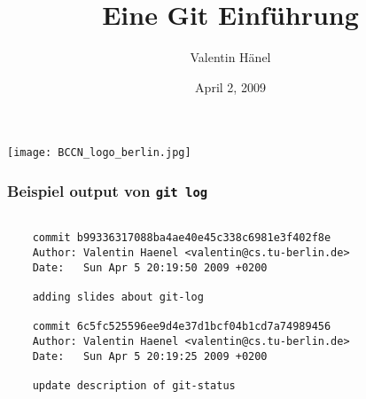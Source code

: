 \documentclass{beamer}
\author{Valentin H\"anel}
\institute{Bernstein Center for Computational Neuroscience Berlin}
\title{Eine Git Einführung}
\date{April 2, 2009}
\begin{document}

\begin{frame}
	\texttt{[image: BCCN\_logo\_berlin.jpg]}
	\titlepage
\end{frame}















\begin{frame}[fragile]
    \frametitle{Beispiel output von {\tt git log}}

    \begin{verbatim}

    commit b99336317088ba4ae40e45c338c6981e3f402f8e
    Author: Valentin Haenel <valentin@cs.tu-berlin.de>
    Date:   Sun Apr 5 20:19:50 2009 +0200

    adding slides about git-log

    commit 6c5fc525596ee9d4e37d1bcf04b1cd7a74989456
    Author: Valentin Haenel <valentin@cs.tu-berlin.de>
    Date:   Sun Apr 5 20:19:25 2009 +0200

    update description of git-status


    \end{verbatim}

\end{frame}
\end{document}
